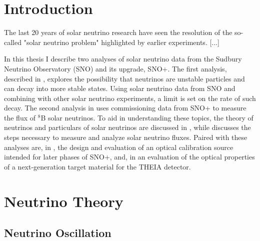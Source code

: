 \chapter{Introduction}

The last 20 years of solar neutrino research have seen the resolution of the so-called "solar neutrino problem" highlighted by earlier experiments. [...]

In this thesis I describe two analyses of solar neutrino data from the Sudbury Neutrino Observatory (SNO) and its upgrade, SNO+.
The first analysis, described in , explores the possibility that neutrinos are unstable particles and can decay into more stable states.
Using solar neutrino data from SNO and combining with other solar neutrino experiments, a limit is set on the rate of such decay. 
The second analysis in  uses commissioning data from SNO+ to measure the flux of $^8$B solar neutrinos. 
To aid in understanding these topics, the theory of neutrinos and particulars of solar neutrinos are discussed in , while  discusses the steps necessary to measure and analyze solar neutrino fluxes.
Paired with these analyses are, in , the design and evaluation of an optical calibration source intended for later phases of SNO+, and, in  an evaluation of the optical properties of a next-generation target material for the T\textsc{HEIA} detector.

\chapter{Neutrino Theory}
\label{ch:theory}

\section{Neutrino Oscillation}

